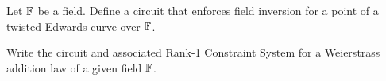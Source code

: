 \begin{exercise}
Let $\mathbb{F}$ be a field. Define a circuit that enforces field inversion for a point of a twisted Edwards curve over $\mathbb{F}$.
\end{exercise}
\begin{exercise}
Write the circuit and associated Rank-1 Constraint System for a Weierstrass addition law of a given field $\mathbb{F}$.
\end{exercise}
